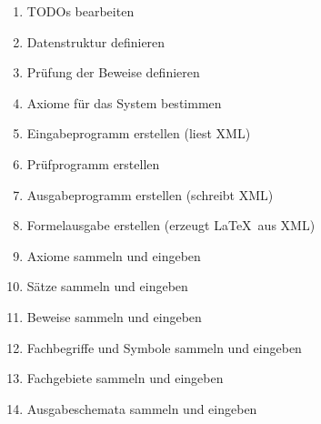 \documentclass[english,ngerman,parskip=half,headsepline,footsepline]{scrreprt}
\begin{document}
	\begin{enumerate}
		\item TODOs bearbeiten
		\item Datenstruktur definieren
		\item Prüfung der Beweise definieren
		\item Axiome für das System bestimmen
		\item Eingabeprogramm erstellen (liest XML)
		\item Prüfprogramm erstellen
		\item Ausgabeprogramm erstellen (schreibt XML)
		\item Formelausgabe erstellen (erzeugt \LaTeX\ aus XML)
		\item Axiome sammeln und eingeben
		\item Sätze sammeln und eingeben
		\item Beweise sammeln und eingeben
		\item Fachbegriffe und Symbole sammeln und eingeben
		\item Fachgebiete sammeln und eingeben
		\item Ausgabeschemata sammeln und eingeben
	\end{enumerate}

	\clearpage


	\ihead{\textnormal{\textsf{\textbf{\listtablename}}}}
	\begin{minipage}{\textwidth-10.95pt}
		\listoftables
	\end{minipage}\par
	\thispagestyle{scrheadings}


	\ihead{\textnormal{\textsf{\textbf{\listfigurename}}}}
	\begin{minipage}{\textwidth-10.95pt}
		\listoffigures
	\end{minipage}\par
	\thispagestyle{scrheadings}

\end{document}
